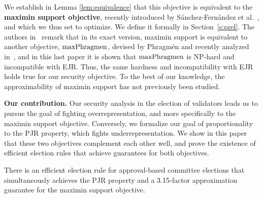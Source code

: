 We establish in Lemma \ref{lem:equivalence} that this objective is equivalent to the \textbf{maximin support objective}, recently introduced by Sánchez-Fernández et al.~\cite{sanchez2016maximin}, and which we thus set to optimize. 
We define it formally in Section~\ref{s:prel}.
The authors in~\cite{sanchez2016maximin} remark that in its exact version, maximin support is equivalent to another objective, $\operatorname{maxPhragmen}$, devised by Phragm\'{e}n and recently analyzed in~\cite{brill2017phragmen}, and in this last paper it is shown that $\operatorname{maxPhragmen}$ is NP-hard and incompatible with EJR. 
Thus, the same hardness and incompatibility with EJR holds true for our security objective. 
To the best of our knowledge, the approximability of maximin support has not previously been studied.

\textbf{Our contribution.}
Our security analysis in the election of validators leads us to pursue the goal of fighting overrepresentation, and more specifically to the maximin support objective.  
Conversely, we formalize our goal of proportionality to the PJR property, which fights underrepresentation. 
We show in this paper that these two objectives complement each other well, and prove the existence of efficient election rules that achieve guarantees for both objectives. 

\begin{theorem}\label{thm:intro1}
There is an efficient election rule for approval-based committee elections that simultaneously achieves the PJR property and a 3.15-factor approximation guarantee for the maximin support objective.
\end{theorem}

